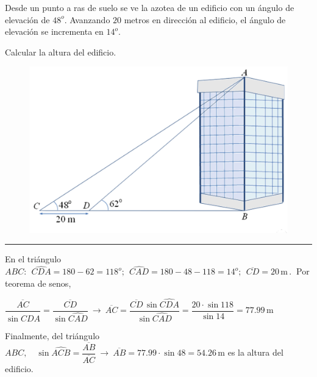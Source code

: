 \begin{miejercicio}


\begin{multicols}{2}

Desde un punto a ras de suelo se ve la azotea de un edificio con un ángulo de elevación de $48^o$. Avanzando $20$ metros en dirección al edificio, el ángulo de elevación se incrementa en $14^o$. 

Calcular la altura del edificio.
 
	\begin{figure}[H]
	\centering
	\includegraphics[width=.4\textwidth]{img-triang/triang18.png}
\end{figure}
\end{multicols}

\vspace{-8mm}

\rule{250pt}{0.1pt}

\vspace{2mm} En el triángulo $ABC:\ \ \widehat{CDA}=180-62=118^o;\ \ \widehat{CAD}=180-48-118=14^o;\ \ \overline{CD}=20\, \mathrm{m}\, . \ $ Por teorema de senos,

\vspace{2mm} $\dfrac{\overline{AC}}{\sin \widehat{CDA}}=\dfrac{\overline{CD}}{\sin \widehat{CAD}}\ \to \ \overline{AC}=\dfrac{\overline{CD}\, \sin \widehat{CDA}}{\sin \widehat{CAD}}=\dfrac{20\cdot \sin 118}{\sin 14}=77.99\, \mathrm{m}$

\vspace{2mm} Finalmente, del triángulo $ABC,\quad \sin \widehat{ACB}=\dfrac{ \overline{AB}}{\overline{AC}}\ \to \ \overline{AB}=77.99 \cdot \sin 48=54.26 \, \mathrm{m}$ es la altura del edificio.

\end{miejercicio}


